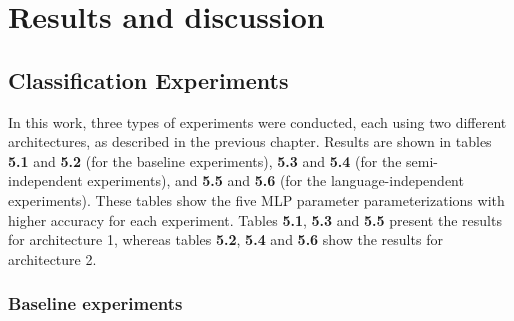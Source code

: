 
\chapter{Results and discussion}
\label{ch:omnisvoluptas}




\section{Classification Experiments}

In this work, three types of experiments were conducted, each using two different architectures, as described in the previous chapter. Results are shown in tables \textbf{5.1} and \textbf{5.2} (for the baseline experiments), \textbf{5.3} and \textbf{5.4} (for the semi-independent experiments), and \textbf{5.5} and \textbf{5.6} (for the language-independent experiments). These tables show the five MLP parameter parameterizations with higher accuracy for each experiment. Tables \textbf{5.1}, \textbf{5.3} and \textbf{5.5} present the results for architecture 1, whereas tables \textbf{5.2}, \textbf{5.4} and \textbf{5.6} show the results for architecture 2.

\subsection{Baseline experiments}

